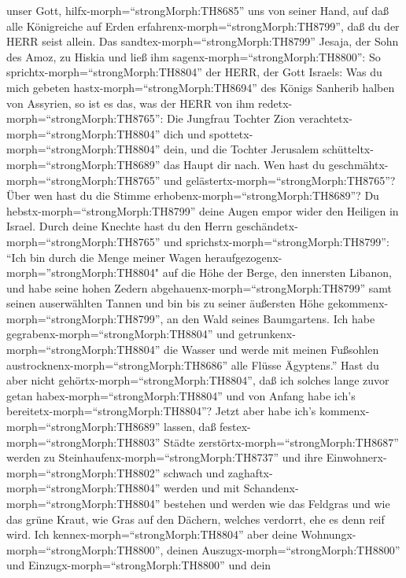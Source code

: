 unser Gott, hilfx-morph=``strongMorph:TH8685'' uns von seiner Hand, auf
daß alle Königreiche auf Erden erfahrenx-morph=``strongMorph:TH8799'',
daß du der HERR seist allein.  Das
sandtex-morph=``strongMorph:TH8799'' Jesaja, der Sohn des Amoz, zu
Hiskia und ließ ihm sagenx-morph=``strongMorph:TH8800'': So
sprichtx-morph=``strongMorph:TH8804'' der HERR, der Gott Israels: Was du
mich gebeten hastx-morph=``strongMorph:TH8694'' des Königs Sanherib
halben von Assyrien,  so ist es das, was der HERR von ihm
redetx-morph=``strongMorph:TH8765'': Die Jungfrau Tochter Zion
verachtetx-morph=``strongMorph:TH8804'' dich und
spottetx-morph=``strongMorph:TH8804'' dein, und die Tochter Jerusalem
schütteltx-morph=``strongMorph:TH8689'' das Haupt dir nach.
 Wen hast du geschmähtx-morph=``strongMorph:TH8765'' und
gelästertx-morph=``strongMorph:TH8765''? Über wen hast du die Stimme
erhobenx-morph=``strongMorph:TH8689''? Du
hebstx-morph=``strongMorph:TH8799'' deine Augen empor wider den Heiligen
in Israel.  Durch deine Knechte hast du den Herrn
geschändetx-morph=``strongMorph:TH8765'' und
sprichstx-morph=``strongMorph:TH8799'': ``Ich bin durch die Menge meiner
Wagen heraufgezogenx-morph=''strongMorph:TH8804" auf die Höhe der Berge,
den innersten Libanon, und habe seine hohen Zedern
abgehauenx-morph=``strongMorph:TH8799'' samt seinen auserwählten Tannen
und bin bis zu seiner äußersten Höhe
gekommenx-morph=``strongMorph:TH8799'', an den Wald seines Baumgartens.
 Ich habe gegrabenx-morph=``strongMorph:TH8804'' und
getrunkenx-morph=``strongMorph:TH8804'' die Wasser und werde mit meinen
Fußsohlen austrocknenx-morph=``strongMorph:TH8686'' alle Flüsse
Ägyptens.''  Hast du aber nicht
gehörtx-morph=``strongMorph:TH8804'', daß ich solches lange zuvor getan
habex-morph=``strongMorph:TH8804'' und von Anfang habe ich's
bereitetx-morph=``strongMorph:TH8804''? Jetzt aber habe ich's
kommenx-morph=``strongMorph:TH8689'' lassen, daß
festex-morph=``strongMorph:TH8803'' Städte
zerstörtx-morph=``strongMorph:TH8687'' werden zu
Steinhaufenx-morph=``strongMorph:TH8737''  und ihre
Einwohnerx-morph=``strongMorph:TH8802'' schwach und
zaghaftx-morph=``strongMorph:TH8804'' werden und mit
Schandenx-morph=``strongMorph:TH8804'' bestehen und werden wie das
Feldgras und wie das grüne Kraut, wie Gras auf den Dächern, welches
verdorrt, ehe es denn reif wird.  Ich
kennex-morph=``strongMorph:TH8804'' aber deine
Wohnungx-morph=``strongMorph:TH8800'', deinen
Auszugx-morph=``strongMorph:TH8800'' und
Einzugx-morph=``strongMorph:TH8800'' und dein
